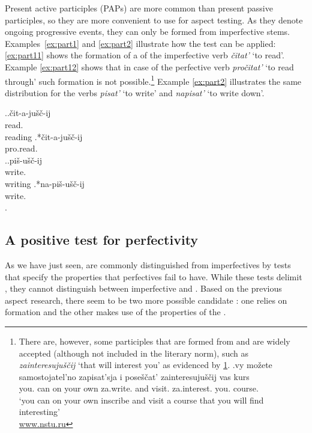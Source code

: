 Present active participles  (PAPs) are more common than present passive participles, so they are more convenient to use for aspect testing. As they denote ongoing progressive events, they can only be formed from imperfective stems. Examples~\ref{ex:part1} and \ref{ex:part2} illustrate how the test can be applied: \ref{ex:part11} shows the formation of a  of the imperfective verb \textit{\v{c}itat'} `to read'. Example \ref{ex:part12} shows that in case of the perfective verb \textit{pro\v{c}itat'} `to read through' such formation is not possible.\footnote{There are, however, some participles that are formed from  and are widely accepted (although not included in the literary norm), such as \textit{zainteresuju\v{s}\v{c}ij} `that will interest you' as evidenced by \ref{ex:PFP}.
\exg.\label{ex:PFP}vy mo\v{z}ete samostojatel'no zapisat'sja i pose\v{s}\v{c}at' zainteresuju\v{s}\v{c}ij vas kurs\\
you. can {on your own} za.write. and visit. za.interest. you. course.\\
\trans `you can on your own inscribe and visit a course that you will find interesting'\\\hbox{} \hfill \hbox{\url{www.nstu.ru}}

} Example \ref{ex:part2} illustrates the same distribution for the verbs \textit{pisat'}\textsuperscript{\IPF} `to write' and \textit{napisat'}\textsuperscript{\PF} `to write down'.

\ex.\label{ex:part1}\ag.\label{ex:part11}\v{c}it-a-ju\v{s}\v{c}-ij\\
read\textsuperscript{\IPF}.\\
reading
\bg.\label{ex:part12}*\v{c}it-a-ju\v{s}\v{c}-ij\\
pro.read\textsuperscript{\PF}.\\

\ex.\label{ex:part2}\ag.\label{ex:part21}pi\v{s}-u\v{s}\v{c}-ij\\
write\textsuperscript{\IPF}.\\
writing
\bg.\label{ex:part22}*na-pi\v{s}-u\v{s}\v{c}-ij\\
write\textsuperscript{\PF}.\\
\z.


\subsection{A positive test for perfectivity}\label{sec:tests:new}
As we have just seen,  are commonly distinguished from imperfectives by tests that specify the properties that perfectives fail to have. While these tests delimit , they cannot distinguish between imperfective and . Based on the previous aspect research, there seem to be two more possible candidate : one relies on  formation and the other makes use of the properties of the . %

